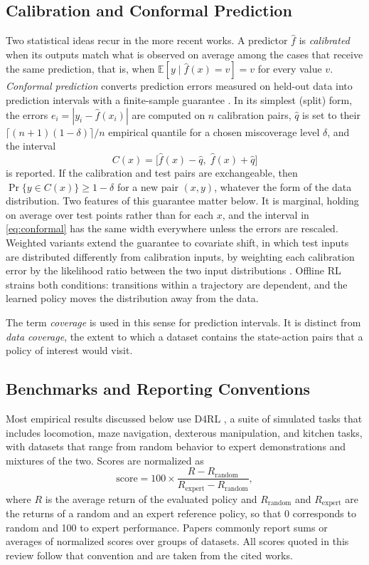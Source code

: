 \documentclass[journal]{IEEEtran}
\begin{document}
\subsection{Calibration and Conformal Prediction}
Two statistical ideas recur in the more recent works. A predictor $\hat{f}$ is \emph{calibrated} when its outputs match what is observed on average among the cases that receive the same prediction, that is, when $\mathbb{E}[y \mid \hat{f}(x) = v] = v$ for every value $v$. \emph{Conformal prediction} converts prediction errors measured on held-out data into prediction intervals with a finite-sample guarantee \cite{angelopoulos2023conformal}. In its simplest (split) form, the errors $e_i = |y_i - \hat{f}(x_i)|$ are computed on $n$ calibration pairs, $\hat{q}$ is set to their $\lceil (n+1)(1-\delta) \rceil / n$ empirical quantile for a chosen miscoverage level $\delta$, and the interval
\begin{equation}
C(x) = \big[\hat{f}(x) - \hat{q},\; \hat{f}(x) + \hat{q}\big]
\label{eq:conformal}
\end{equation}
is reported. If the calibration and test pairs are exchangeable, then $\Pr\{y \in C(x)\} \geq 1 - \delta$ for a new pair $(x,y)$, whatever the form of the data distribution. Two features of this guarantee matter below. It is marginal, holding on average over test points rather than for each $x$, and the interval in \eqref{eq:conformal} has the same width everywhere unless the errors are rescaled. Weighted variants extend the guarantee to covariate shift, in which test inputs are distributed differently from calibration inputs, by weighting each calibration error by the likelihood ratio between the two input distributions \cite{tibshirani2019covariate}. Offline RL strains both conditions: transitions within a trajectory are dependent, and the learned policy moves the distribution away from the data.

The term \emph{coverage} is used in this sense for prediction intervals. It is distinct from \emph{data coverage}, the extent to which a dataset contains the state-action pairs that a policy of interest would visit.

\subsection{Benchmarks and Reporting Conventions}
Most empirical results discussed below use D4RL \cite{fu2020d4rl}, a suite of simulated tasks that includes locomotion, maze navigation, dexterous manipulation, and kitchen tasks, with datasets that range from random behavior to expert demonstrations and mixtures of the two. Scores are normalized as
\begin{equation}
\text{score} = 100 \times \frac{R - R_{\mathrm{random}}}{R_{\mathrm{expert}} - R_{\mathrm{random}}},
\label{eq:score}
\end{equation}
where $R$ is the average return of the evaluated policy and $R_{\mathrm{random}}$ and $R_{\mathrm{expert}}$ are the returns of a random and an expert reference policy, so that 0 corresponds to random and 100 to expert performance. Papers commonly report sums or averages of normalized scores over groups of datasets. All scores quoted in this review follow that convention and are taken from the cited works.
\end{document}
